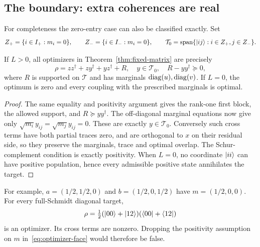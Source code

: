 \subsection{The boundary: extra coherences are real}
For completeness the zero-entry case can also be classified exactly. Set
\[
 Z_+=\{i\in I_+:m_i=0\},\qquad
 Z_-=\{i\in I_-:m_i=0\},\qquad
 \mathcal T_0=\operatorname{span}\{\lvert ij\rangle:i\in Z_+,j\in Z_-\}.
\]
\begin{theorem}\label{thm:boundary-face}
If $L>0$, all optimizers in Theorem~\ref{thm:fixed-matrix} are precisely
\begin{equation}\label{eq:boundary-face}
 \rho=zz^\dagger+zy^\dagger+yz^\dagger+R,
 \quad y\in\mathcal T_0,\quad R-yy^\dagger\succeq0,
\end{equation}
where $R$ is supported on $\mathcal T$ and has marginals $\operatorname{diag}(u),\operatorname{diag}(v)$. If $L=0$, the optimum is zero and every coupling with the prescribed marginals is optimal.
\end{theorem}
\begin{proof}
The same equality and positivity argument gives the rank-one first block, the allowed support, and $R\succeq yy^\dagger$. The off-diagonal marginal equations now give only $\sqrt{m_i}y_{ij}=\sqrt{m_j}y_{ij}=0$. These are exactly $y\in\mathcal T_0$. Conversely such cross terms have both partial traces zero, and are orthogonal to $x$ on their residual side, so they preserve the marginals, trace and optimal overlap. The Schur-complement condition is exactly positivity. When $L=0$, no coordinate $\lvert ii\rangle$ can have positive population, hence every admissible positive state annihilates the target.
\end{proof}

For example, $a=(1/2,1/2,0)$ and $b=(1/2,0,1/2)$ have $m=(1/2,0,0)$. For every full-Schmidt diagonal target,
\[
 \rho=\tfrac12(\lvert 00\rangle+\lvert 12\rangle)(\langle 00\rvert+\langle 12\rvert)
\]
is an optimizer. Its cross terms are nonzero. Dropping the positivity assumption on $m$ in~\eqref{eq:optimizer-face} would therefore be false.

